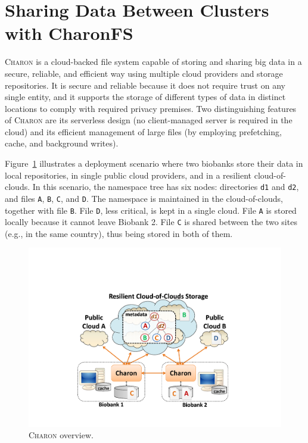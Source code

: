 \section{Sharing Data Between Clusters with CharonFS}
\textsc{Charon} is a cloud-backed file system capable of storing and sharing big data in a secure, reliable, and efficient way using multiple cloud providers and storage repositories. 
It is secure and reliable because it does not require trust on any single entity, and it supports the storage of different types of data in distinct locations to comply with required privacy premises. 
Two distinguishing features of \textsc{Charon} are its serverless design (no client-managed server is required in the cloud) and its efficient management of large files (by employing prefetching, cache, and background writes).

Figure~\ref{fig:charon} illustrates a deployment scenario where two biobanks store their data in local repositories, in single public cloud providers, and in a resilient cloud-of-clouds. 
In this scenario, the namespace tree has six nodes: directories \texttt{d1} and \texttt{d2}, and files \texttt{A}, \texttt{B}, \texttt{C}, and \texttt{D}. 
The namespace is maintained in the cloud-of-clouds, together with file \texttt{B}.
File \texttt{D}, less critical, is kept in a single cloud.
File \texttt{A} is stored locally because it cannot leave Biobank 2. 
File \texttt{C} is shared between the two sites (e.g., in the same country), thus being stored in both of them.



\begin{figure}[h]
 \centering
 \includegraphics[width=0.75\columnwidth]{./imgs/charon_arch.pdf}
\caption{\small \textsc{Charon} overview.}
\label{fig:charon}
\end{figure}


